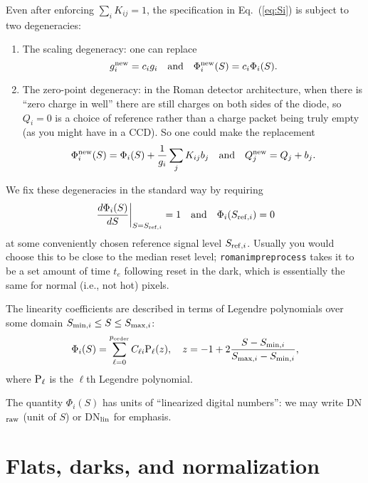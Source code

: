 \documentclass[prd,onecolumn,nofootinbib,nobibnotes]{revtex4}
\begin{document}
Even after enforcing $\sum_i K_{ij}=1$, the specification in Eq.~(\ref{eq:Si}) is subject to two degeneracies:
\begin{enumerate}
\item The scaling degeneracy: one can replace
\begin{equation}
g^{\rm new}_i = c_ig_i ~~~{\rm and}~~~ \Phi^{\rm new}_i(S) = c_i\Phi_i(S).
\end{equation}
\item The zero-point degeneracy: in the Roman detector architecture, when there is ``zero charge in well'' there are still charges on both sides of the diode, so $Q_i=0$ is a choice of reference rather than a charge packet being truly empty (as you might have in a CCD). So one could make the replacement
\begin{equation}
\Phi^{\rm new}_i(S) = \Phi_i(S) + \frac1{g_i} \sum_j K_{ij} b_j ~~~{\rm and}~~~ Q^{\rm new}_j = Q_j+b_j.
\end{equation}
\end{enumerate}
We fix these degeneracies in the standard way by requiring
\begin{equation}
\left. \frac{d\Phi_i(S)}{dS} \right|_{S=S_{{\rm ref},i}} = 1
~~~{\rm and}~~~
\Phi_i(S_{{\rm ref},i}) = 0
\label{eq:Sref}
\end{equation}
at some conveniently chosen reference signal level $S_{{\rm ref},i}$. Usually you would choose this to be close to the median reset level; {\tt romanimpreprocess} takes it to be a set amount of time $t_e$ following reset in the dark, which is essentially the same for normal (i.e., not hot) pixels.

The linearity coefficients are described in terms of Legendre polynomials over some domain $S_{{\rm min},i}\le S\le S_{{\rm max},i}$:
\begin{equation}
\Phi_i(S) = \sum_{\ell = 0}^{p_{\rm order}} C_{\ell i} {\rm P}_\ell(z),
~~~z = -1 + 2 \frac{S-S_{{\rm min},i}}{S_{{\rm max},i} - S_{{\rm min},i} },
\label{eq:Legendre}
\end{equation}
where ${\rm P}_\ell$ is the $\ell$th Legendre polynomial.

The quantity $\Phi_i(S)$ has units of ``linearized digital numbers'': we may write DN$_{\rm raw}$ (unit of $S$) or DN$_{\rm lin}$ for emphasis.

\section{Flats, darks, and normalization}
\end{document}
